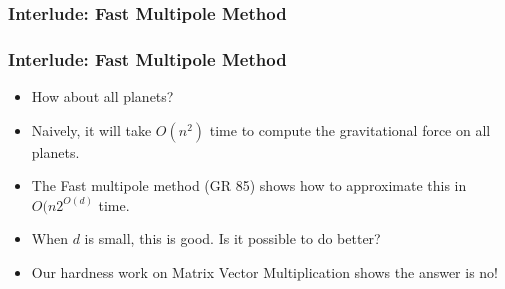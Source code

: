   \begin{frame}
    \frametitle{Interlude: Fast Multipole Method}
\end{frame}
\begin{frame}
    \frametitle{Interlude: Fast Multipole Method}
    \begin{itemize} 
      \item How about all planets?
      \item Naively, it will take $O(n^2)$ time to compute the
        gravitational force on all planets.
      \item The Fast multipole method (GR 85) shows how to approximate
        this in $O(n2^{O(d)}$ time.
      \item When $d$ is small, this is good. Is it possible to do
        better?
      \item Our hardness work on {\color{red} Matrix Vector
        Multiplication} shows the answer is no!
    \end{itemize}
\end{frame}
